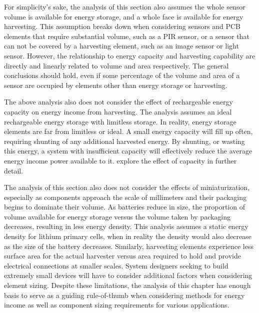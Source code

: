 For simplicity's sake, the analysis of this section also assumes the whole sensor volume is available for energy storage, and a whole face is available for energy harvesting.
This assumption breaks down when considering sensors and PCB elements that require substantial volume, such as a PIR sensor, or a sensor that can not be covered by a harvesting element, such as an image sensor or light sensor.
However, the relationship to energy capacity and harvesting capability are directly and linearly related to volume and area respectively. The general conclusions should hold, even if some percentage of the volume and area of a sensor are occupied by elements other than energy storage or harvesting. 

The above analysis also does not consider the effect of rechargeable energy capacity on energy income from harvesting. 
The analysis assumes an ideal rechargeable energy storage with limitless storage.
In reality, energy storage elements are far from limitless or ideal.
A small energy capacity will fill up often, requiring shunting of any additional harvested energy. 
By shunting, or wasting this energy, a system with insufficient capacity will effectively reduce the average energy income power available to it.  explore the effect of capacity in further detail.

The analysis of this section also does not consider the effects of miniaturization, especially as components approach the scale of millimeters and their packaging begins to dominate their volume. As batteries reduce in size, the proportion of volume available for energy storage versus the volume taken by packaging decreases, resulting in less energy density. This analysis assumes a static energy density for lithium primary cells, when in reality the density would also decrease as the size of the battery decreases. Similarly, harvesting elements experience less surface area for the actual harvester versus area required to hold and provide electrical connections at smaller scales.
System designers seeking to build extremely small devices will have to consider additional factors when considering element sizing.
Despite these limitations, the analysis of this chapter has enough basis to serve as a guiding rule-of-thumb when considering methods for energy income as well as component sizing requirements for various applications. 




